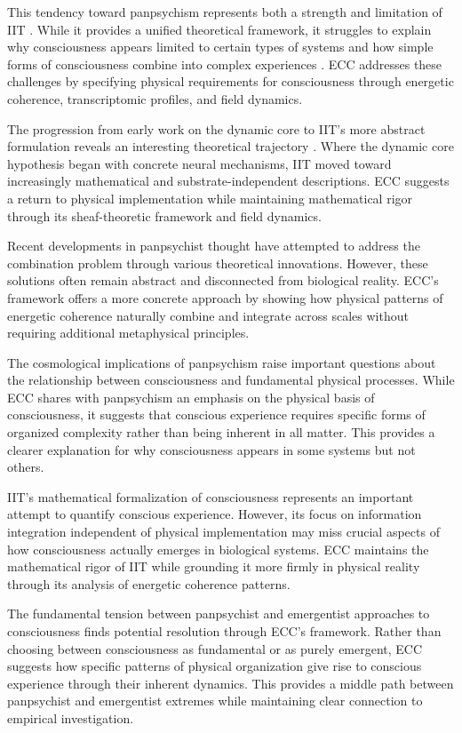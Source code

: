 This tendency toward panpsychism represents both a strength and limitation of IIT \cite{Tononi2008}. While it provides a unified theoretical framework, it struggles to explain why consciousness appears limited to certain types of systems and how simple forms of consciousness combine into complex experiences \cite{Chalmers2015}. ECC addresses these challenges by specifying physical requirements for consciousness through energetic coherence, transcriptomic profiles, and field dynamics.

The progression from early work on the dynamic core to IIT's more abstract formulation reveals an interesting theoretical trajectory \cite{Tononi2016}. Where the dynamic core hypothesis began with concrete neural mechanisms, IIT moved toward increasingly mathematical and substrate-independent descriptions. ECC suggests a return to physical implementation while maintaining mathematical rigor through its sheaf-theoretic framework and field dynamics.

Recent developments in panpsychist thought \cite{Skrbina2017} have attempted to address the combination problem through various theoretical innovations. However, these solutions often remain abstract and disconnected from biological reality. ECC's framework offers a more concrete approach by showing how physical patterns of energetic coherence naturally combine and integrate across scales without requiring additional metaphysical principles.

The cosmological implications of panpsychism \cite{Shani2015} raise important questions about the relationship between consciousness and fundamental physical processes. While ECC shares with panpsychism an emphasis on the physical basis of consciousness, it suggests that conscious experience requires specific forms of organized complexity rather than being inherent in all matter. This provides a clearer explanation for why consciousness appears in some systems but not others.

IIT's mathematical formalization of consciousness \cite{Oizumi2014} represents an important attempt to quantify conscious experience. However, its focus on information integration independent of physical implementation may miss crucial aspects of how consciousness actually emerges in biological systems. ECC maintains the mathematical rigor of IIT while grounding it more firmly in physical reality through its analysis of energetic coherence patterns.

The fundamental tension between panpsychist and emergentist approaches to consciousness \cite{Goff2019} finds potential resolution through ECC's framework. Rather than choosing between consciousness as fundamental or as purely emergent, ECC suggests how specific patterns of physical organization give rise to conscious experience through their inherent dynamics. This provides a middle path between panpsychist and emergentist extremes while maintaining clear connection to empirical investigation.

